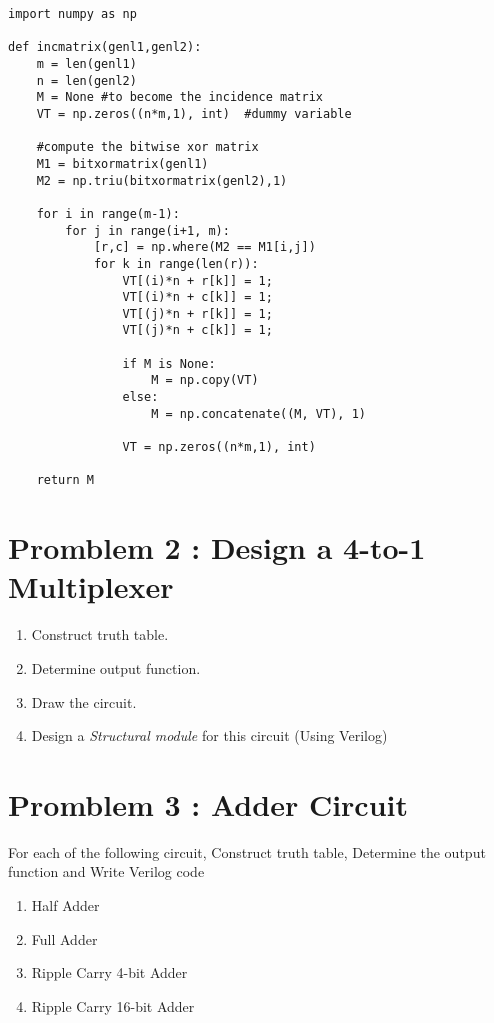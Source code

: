 \documentclass{vhdl-assignment}
\begin{document}
\begin{lstlisting}
import numpy as np
    
def incmatrix(genl1,genl2):
    m = len(genl1)
    n = len(genl2)
    M = None #to become the incidence matrix
    VT = np.zeros((n*m,1), int)  #dummy variable
    
    #compute the bitwise xor matrix
    M1 = bitxormatrix(genl1)
    M2 = np.triu(bitxormatrix(genl2),1) 

    for i in range(m-1):
        for j in range(i+1, m):
            [r,c] = np.where(M2 == M1[i,j])
            for k in range(len(r)):
                VT[(i)*n + r[k]] = 1;
                VT[(i)*n + c[k]] = 1;
                VT[(j)*n + r[k]] = 1;
                VT[(j)*n + c[k]] = 1;
                
                if M is None:
                    M = np.copy(VT)
                else:
                    M = np.concatenate((M, VT), 1)
                
                VT = np.zeros((n*m,1), int)
    
    return M
\end{lstlisting}

\pagebreak
\section*{Promblem 2 : Design a 4-to-1 Multiplexer }

\begin{enumerate}
    \item Construct truth table.
    \item Determine output function.
    \item Draw the circuit.
    \item Design a \emph{Structural module} for this circuit (Using Verilog)
\end{enumerate}

\section*{Promblem 3 : Adder Circuit}

For each of the following circuit, Construct truth table, Determine the output function and Write Verilog code 

\begin{enumerate}
    \item Half Adder
    \item Full Adder
    \item Ripple Carry 4-bit Adder
    \item Ripple Carry 16-bit Adder
\end{enumerate}
\end{document}
